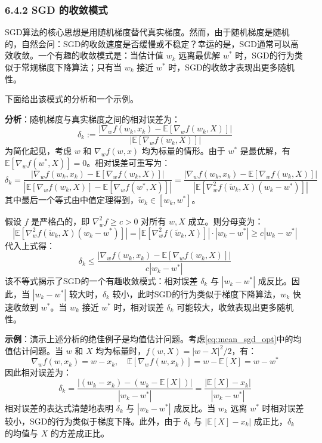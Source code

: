 \documentclass[UTF8]{article}
\begin{document}
\subsubsection*{6.4.2 SGD 的收敛模式}

SGD算法的核心思想是用随机梯度替代真实梯度。然而，由于随机梯度是随机的，自然会问：SGD的收敛速度是否缓慢或不稳定？幸运的是，SGD通常可以高效收敛。一个有趣的收敛模式是：当估计值 $w_k$ 远离最优解 $w^*$ 时，SGD的行为类似于常规梯度下降算法；只有当 $w_k$ 接近 $w^*$ 时，SGD的收敛才表现出更多随机性。

下面给出该模式的分析和一个示例。

\textbf{分析}：随机梯度与真实梯度之间的相对误差为：
\[
\delta_k := \frac{|\nabla_w f(w_k, x_k) - \mathbb{E}[\nabla_w f(w_k, X)]|}{|\mathbb{E}[\nabla_w f(w_k, X)]|}
\]
为简化起见，考虑 $w$ 和 $\nabla_w f(w, x)$ 均为标量的情形。由于 $w^*$ 是最优解，有 $\mathbb{E}[\nabla_w f(w^*, X)] = 0$。相对误差可重写为：
\[
\delta_k = \frac{|\nabla_w f(w_k, x_k) - \mathbb{E}[\nabla_w f(w_k, X)]|}{|\mathbb{E}[\nabla_w f(w_k, X)] - \mathbb{E}[\nabla_w f(w^*, X)]|} = \frac{|\nabla_w f(w_k, x_k) - \mathbb{E}[\nabla_w f(w_k, X)]|}{|\mathbb{E}[\nabla_w^2 f(\tilde{w}_k, X)(w_k - w^*)]|}
\]
其中最后一个等式由中值定理得到，$\tilde{w}_k \in [w_k, w^*]$。

假设 $f$ 是严格凸的，即 $\nabla_w^2 f \geq c > 0$ 对所有 $w, X$ 成立。则分母变为：
\[
|\mathbb{E}[\nabla_w^2 f(\tilde{w}_k, X)(w_k - w^*)]| = |\mathbb{E}[\nabla_w^2 f(\tilde{w}_k, X)]| \cdot |w_k - w^*| \geq c |w_k - w^*|
\]
代入上式得：
\[
\delta_k \leq \frac{|\nabla_w f(w_k, x_k) - \mathbb{E}[\nabla_w f(w_k, X)]|}{c |w_k - w^*|}
\]
该不等式揭示了SGD的一个有趣收敛模式：相对误差 $\delta_k$ 与 $|w_k - w^*|$ 成反比。因此，当 $|w_k - w^*|$ 较大时，$\delta_k$ 较小，此时SGD的行为类似于梯度下降算法，$w_k$ 快速收敛到 $w^*$。当 $w_k$ 接近 $w^*$ 时，相对误差 $\delta_k$ 可能较大，收敛表现出更多随机性。

\textbf{示例}：演示上述分析的绝佳例子是均值估计问题。考虑\eqref{eq:mean_sgd_opt}中的均值估计问题。当 $w$ 和 $X$ 均为标量时，$f(w, X) = |w - X|^2/2$，有：
\[
\nabla_w f(w, x_k) = w - x_k, \quad \mathbb{E}[\nabla_w f(w, x_k)] = w - \mathbb{E}[X] = w - w^*
\]
因此相对误差为：
\[
\delta_k = \frac{|(w_k - x_k) - (w_k - \mathbb{E}[X])|}{|w_k - w^*|} = \frac{|\mathbb{E}[X] - x_k|}{|w_k - w^*|}
\]
相对误差的表达式清楚地表明 $\delta_k$ 与 $|w_k - w^*|$ 成反比。当 $w_k$ 远离 $w^*$ 时相对误差较小，SGD的行为类似于梯度下降。此外，由于 $\delta_k$ 与 $|\mathbb{E}[X] - x_k|$ 成正比，$\delta_k$ 的均值与 $X$ 的方差成正比。
\end{document}
